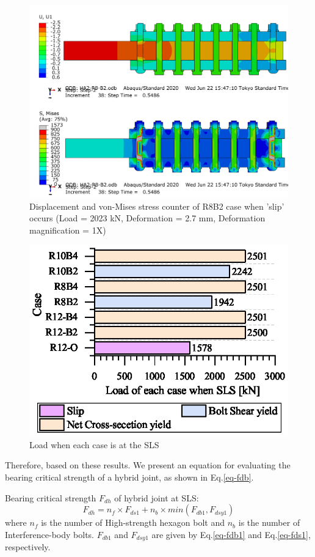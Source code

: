 \begin{figure}[htbp]
    \centering
    \includegraphics[width=0.9\linewidth]{imgs/ch5/R8B2slip.png}
    \caption{Displacement and von-Mises stress counter of R8B2 case when 'slip' occurs (Load = 2023 kN, Deformation = 2.7 mm, Deformation magnification = 1X)}
    \label{figc-R8B2slip}
\end{figure}

\begin{figure}[htbp]
    \centering
    \includegraphics[width=0.65\linewidth]{imgs/ch5/P-SLS.eps}
    \caption{Load when each case is at the SLS}
    \label{fig-PSLS}
\end{figure}


Therefore, based on these results. We present an equation for evaluating the bearing critical strength of a hybrid joint, as shown in Eq.\ref{eq-fdb}. 

\noindent Bearing critical strength $F_{dh}$ of hybrid joint at SLS:
\begin{equation}
    \label{eq-fdb}
    F_{dh}= n_f \times F_{ds1} + n_b\times min(F_{db1}, F_{dsy1})
\end{equation}
where $n_{f}$ is the number of High-strength hexagon bolt and $n_b$ is the number of Interference-body bolts. $F_{db1}$ and $F_{dsy1}$ are given by Eq.\ref{eq-fdb1} and Eq.\ref{eq-fds1}, respectively.

